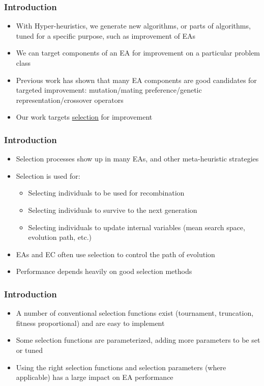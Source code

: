 \documentclass{beamer}
\begin{document}
	\begin{frame}
		\frametitle{Introduction}
		\begin{itemize}
			\item<1-|alert@1> With Hyper-heuristics, we generate new algorithms, or parts of algorithms, tuned for a specific purpose, such as improvement of EAs
			\item<2-|alert@2> We can target components of an EA for improvement on a particular problem class
			\item<3-|alert@3> Previous work has shown that many EA components are good candidates for targeted improvement: mutation/mating preference/genetic representation/crossover operators
			\item<4-|alert@4> Our work targets \underline{selection} for improvement
		\end{itemize}
	\end{frame}	
	
	\begin{frame}
		\frametitle{Introduction}
		\begin{itemize}
			\item<1-|alert@1> Selection processes show up in many EAs, and other meta-heuristic strategies
			\item<2-|alert@2> Selection is used for:
			\begin{itemize}
				\item<3-|alert@3> Selecting individuals to be used for recombination
				\item<4-|alert@4> Selecting individuals to survive to the next generation
				\item<5-|alert@5> Selecting individuals to update internal variables (mean search space, evolution path, etc.)
			\end{itemize}			
			\item<6-|alert@6> EAs and EC often use selection to control the path of evolution
			\item<7-|alert@7> Performance depends heavily on good selection methods
		\end{itemize}
	\end{frame}	
	
	\begin{frame}
		\frametitle{Introduction}
		\begin{itemize}
			\item<1-|alert@1> A number of conventional selection functions exist (tournament, truncation, fitness proportional) and are easy to implement
			\item<2-|alert@2> Some selection functions are parameterized, adding more parameters to be set or tuned
			\item<3-|alert@3> Using the right selection functions and selection parameters (where applicable) has a large impact on EA performance
		\end{itemize}
	\end{frame}		
	
\end{document}
